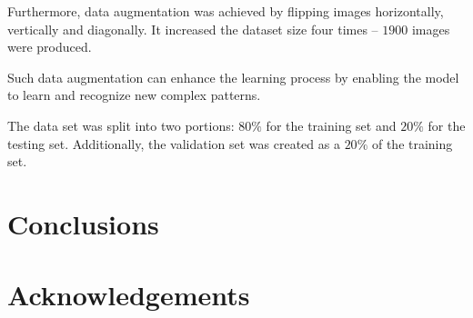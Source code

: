 \documentclass[preprint,9pt]{elsarticle}
\begin{document}
	Furthermore, data augmentation was achieved by flipping images horizontally, vertically and diagonally. 
	It increased the dataset size four times -- \(1900\) images were produced.
	
	Such data augmentation can enhance the learning process by enabling the model to learn and recognize new complex patterns.
	
	The data set was split into two portions:  \(80\%\) for the training set and \(20\%\) for the testing set.
	Additionally, the validation set was created as a \(20\%\) of the training set.

	
	
	
	\section{Conclusions}



	\section*{Acknowledgements}

	
	\section*{ }
	
	
	
	
\end{document}
